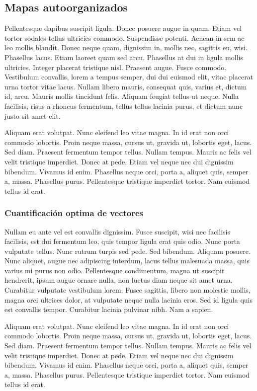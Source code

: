 \subsection{Mapas autoorganizados}

Pellentesque dapibus suscipit ligula.  Donec posuere augue in quam.
Etiam vel tortor sodales tellus ultricies commodo.  Suspendisse
potenti.  Aenean in sem ac leo mollis blandit.  Donec neque quam,
dignissim in, mollis nec, sagittis eu, wisi.  Phasellus lacus.  Etiam
laoreet quam sed arcu.  Phasellus at dui in ligula mollis ultricies.
Integer placerat tristique nisl.  Praesent augue.  Fusce commodo.
Vestibulum convallis, lorem a tempus semper, dui dui euismod elit,
vitae placerat urna tortor vitae lacus.  Nullam libero mauris,
consequat quis, varius et, dictum id, arcu.  Mauris mollis tincidunt
felis.  Aliquam feugiat tellus ut neque.  Nulla facilisis, risus a
rhoncus fermentum, tellus tellus lacinia purus, et dictum nunc justo
sit amet elit.

Aliquam erat volutpat.  Nunc eleifend leo vitae magna.  In id erat non
orci commodo lobortis.  Proin neque massa, cursus ut, gravida ut,
lobortis eget, lacus.  Sed diam.  Praesent fermentum tempor tellus.
Nullam tempus.  Mauris ac felis vel velit tristique imperdiet.  Donec
at pede.  Etiam vel neque nec dui dignissim bibendum.  Vivamus id
enim.  Phasellus neque orci, porta a, aliquet quis, semper a, massa.
Phasellus purus.  Pellentesque tristique imperdiet tortor.  Nam
euismod tellus id erat.


\subsubsection{Cuantificación optima de vectores}

Nullam eu ante vel est convallis dignissim.  Fusce suscipit, wisi nec
facilisis facilisis, est dui fermentum leo, quis tempor ligula erat
quis odio.  Nunc porta vulputate tellus.  Nunc rutrum turpis sed pede.
Sed bibendum.  Aliquam posuere.  Nunc aliquet, augue nec adipiscing
interdum, lacus tellus malesuada massa, quis varius mi purus non odio.
Pellentesque condimentum, magna ut suscipit hendrerit, ipsum augue
ornare nulla, non luctus diam neque sit amet urna.  Curabitur
vulputate vestibulum lorem.  Fusce sagittis, libero non molestie
mollis, magna orci ultrices dolor, at vulputate neque nulla lacinia
eros.  Sed id ligula quis est convallis tempor.  Curabitur lacinia
pulvinar nibh.  Nam a sapien.

Aliquam erat volutpat.  Nunc eleifend leo vitae magna.  In id erat non
orci commodo lobortis.  Proin neque massa, cursus ut, gravida ut,
lobortis eget, lacus.  Sed diam.  Praesent fermentum tempor tellus.
Nullam tempus.  Mauris ac felis vel velit tristique imperdiet.  Donec
at pede.  Etiam vel neque nec dui dignissim bibendum.  Vivamus id
enim.  Phasellus neque orci, porta a, aliquet quis, semper a, massa.
Phasellus purus.  Pellentesque tristique imperdiet tortor.  Nam
euismod tellus id erat.

